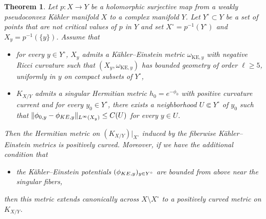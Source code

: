 \documentclass[a4paper, 11pt]{amsart}
\theoremstyle{plain}
\newtheorem{theorem}{Theorem}[section]
\numberwithin{equation}{section} %
\numberwithin{figure}{section} %
\theoremstyle{plain}
\theoremstyle{plain}
\theoremstyle{plain}
\theoremstyle{plain}
\theoremstyle{remark}
\theoremstyle{definition}
\theoremstyle{definition}
\newcommand{\X}{\mathcal{X}}
\begin{document}
\begin{theorem}\label{thm: psh-variation}
  Let $p:X \to Y$  be a holomorphic surjective map from a weakly pseudoconvex K\"ahler manifold $X$ to a complex manifold $Y$. Let $Y^\circ\subset Y$ be a set of points that are not critical values of $p$ in $Y$ and set $X^\circ=p^{-1}(Y^\circ)$ and $X_y= p^{-1}(\{y\})$. 
    Assume  that 
\begin{itemize}
    \item[(i)] for every $y\in Y^\circ $, $X_y$ admits a K\"ahler--Einstein metric $\omega_{\textrm{KE},y}$ with negative Ricci curvature such that $(X_y,\omega_{\textrm{KE},y})$ has bounded geometry of order $\ell\geq 5$, uniformly in $y$ on compact subsets of $Y^\circ$,


    
    \item[(ii)] $K_{X/Y}$ admits a singular Hermitian metric $h_{0}=e^{-\phi_{0}}$ with positive curvature current and for every $y_0\in Y^\circ$, there exists a neighborhood $U\Subset  Y^\circ $ of $y_0$ such that  $\|\phi_{0, y}-\phi_{{{\rm KE}, y}}\|_{L^\infty(X_y)}\leq C(U)$ for every $y\in U$.
    
 
\end{itemize}
Then the Hermitian metric on $(K_{X/Y})|_{X^\circ}$ induced by the fiberwise K\"ahler--Einstein metrics is positively curved.  Moreover, if we have the additional condition that
\begin{itemize}
\item[(iii)] the K\"ahler--Einstein potentials $(\phi_{{\rm KE},y})_{y\in Y^\circ}$ are bounded from above near the singular fibers,
\end{itemize}
then this metric extends canonically across $X\setminus X^\circ$ to a positively curved metric on $K_{X/Y}$. 
\end{theorem}
\end{document}
